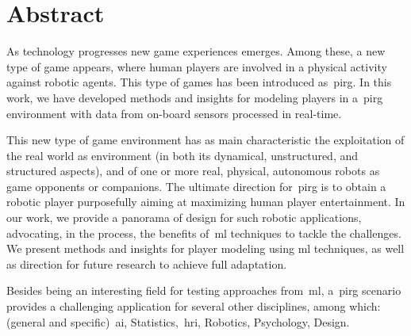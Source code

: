 \chapter*{Abstract}

As technology progresses new game experiences emerges. Among these, a new type of game appears, where human players are involved in a physical activity against robotic agents. This type of games has been introduced as~\gls{pirg}. In this work, we have developed methods and insights for modeling players in a~\gls{pirg} environment with data from on-board sensors processed in real-time.

This new type of game environment has as main characteristic the exploitation of the real world as environment (in both its dynamical, unstructured, and structured aspects), and of one or more real, physical, autonomous robots as game opponents or companions. The ultimate direction for~\gls{pirg} is to obtain a robotic player purposefully aiming at maximizing human player entertainment. In our work, we provide a panorama of design for such robotic applications, advocating, in the process, the benefits of~\gls{ml} techniques to tackle the challenges. We present methods and insights for player modeling using \gls{ml} techniques, as well as direction for future research to achieve full adaptation.

Besides being an interesting field for testing approaches from~\glsdesc{ml}, a~\gls{pirg} scenario provides a challenging application for several other disciplines, among which: (general and specific)~\gls{ai}, Statistics,~\gls{hri}, Robotics, Psychology, Design.




